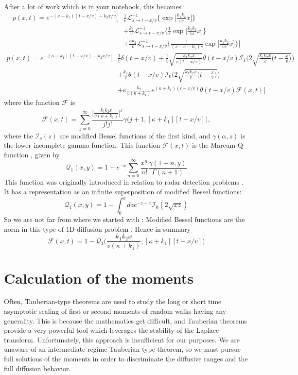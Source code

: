\documentclass[]{agujournal2018}
\newcommand\be{\begin{equation}}
\newcommand\ee{\end{equation}}
\newcommand\El{\mathcal{L}}
\begin{document}
After a lot of work which is in your notebook, this becomes
\begin{align}
p(x,t) = e^{-(\kappa + k_1)(t-x/v)-k_2x/v}
\Big[&\frac{1}{v}\El_{s\rightarrow t-x/v}^{-1}\Big\{\exp\Big[\frac{k_1k_2}{vs}x\Big]\Big\} \\
&+ \frac{k_2}{v}\El_{s\rightarrow t-x/v}^{-1}\Big\{\frac{1}{s}\exp\Big[\frac{k_1k_2}{vs}x\Big]\Big\} \\
&+ \frac{\kappa k_2}{v}\El_{s\rightarrow t-x/v}^{-1}\Big\{\frac{1}{(s-\kappa-k_1)s}\exp\Big[\frac{k_1k_2}{vs}x\Big]\Big\}\Big]
\end{align}
\begin{align}
p(x,t) = e^{-(\kappa + k_1)(t-x/v)-k_2x/v}
\Bigg[&\frac{1}{v}\delta(t-x/v) + \frac{1}{v}\sqrt{\frac{k_1k_2x}{v(t-x/v)}}\theta(t-x/v)\mathcal{I}_1\Bigg(2\sqrt{\frac{k_1k_2x}{v}\Big(t-\frac{x}{v}\Big)}\Bigg)\\
&+\frac{k_2}{v}\theta(t-x/v)\mathcal{I}_0\Bigg(2\sqrt{\frac{k_1k_2x}{v}\Big(t-\frac{x}{v}\Big)}\Bigg)\\
&+ \kappa\frac{ k_2}{v(\kappa+k_1)}e^{(\kappa+k_1)(t-x/v)}\theta(t-x/v)\mathcal{F}(x,t)\Bigg]
\end{align}
where the function $\mathcal{F}$ is
\be \mathcal{F}(x,t) = \sum_{j=0}^\infty \frac{\big[\frac{k_1k_2x}{v(\kappa+k_1)}\big]^j}{j!j!} \gamma\big(j+1,[\kappa+k_1][t-x/v]\big),\ee
where the $\mathcal{I}_\nu(z)$ are modified Bessel functions of the first kind, and $\gamma(\alpha,z)$ is the lower incomplete gamma function.
This function $\mathcal{F}(x,t)$ is the Marcum Q-function \citep{Temme1996}, given by 
\be \mathcal{Q}_1(x,y) = 1-e^{-x}\sum_{n=0}^\infty \frac{x^n}{n!}\frac{\gamma(1+n,y)}{\Gamma(n+1)}\ee
This function was originally introduced in relation to radar detection problems \citep[e.g.][]{Marcum1960}. It has a representation as an infinite superposition of modified Bessel functions:
\be \mathcal{Q}_1(x,y) = 1- \int_0^ydz e^{-z-x}\mathcal{I}_0(2\sqrt{xz})\ee
So we are not far from where we started with \citet{Lisle1998}: Modified Bessel functions are the norm in this type of 1D diffusion problem \citep[e.g.][]{Lisle1998}.
Hence in summary \be \mathcal{F}(x,t) = 1-\mathcal{Q}_1\Big(\frac{k_1k_2x}{v(\kappa+k_1)},[\kappa+k_1][t-x/v] \Big)\ee

\section{Calculation of the moments}
\label{sec:appendix2}
Often, Tauberian-type theorems are used to study the long or short time asymptotic scaling of first or second moments of random walks having any generality.
This is because the mathematics get difficult, and Tauberian theorems provide a very powerful tool which leverages the stability of the Laplace transform.
Unfortunately, this approach is insufficient for our purposes. We are unaware of an intermediate-regime Tauberian-type theorem, so we must pursue full solutions of the moments in order to discriminate the diffusive ranges and the full diffusion behavior.
\end{document}
